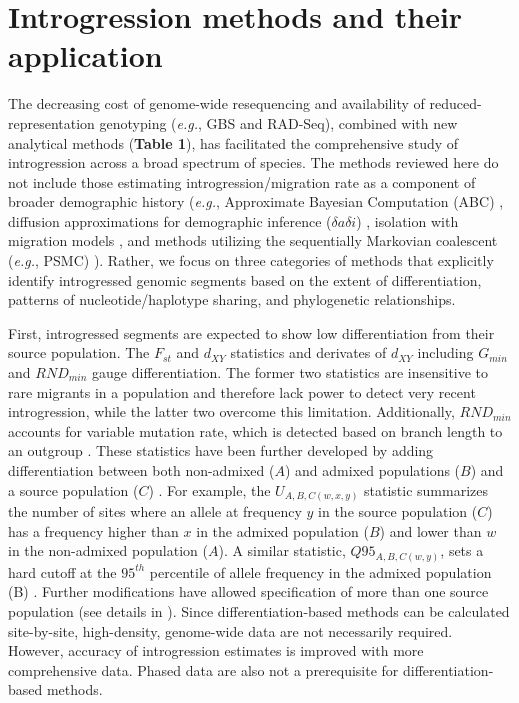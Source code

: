 \documentclass[11pt]{article}
\begin{document}
\section*{Introgression methods and their application}


The decreasing cost of genome-wide resequencing and availability of reduced-representation genotyping (\emph{e.g.}, GBS and RAD-Seq), combined with new analytical methods (\textbf{Table 1}), has facilitated the comprehensive study of introgression across a broad spectrum of species.
The methods reviewed here do not include those estimating introgression\slash migration rate as a component of broader demographic history (\emph{e.g.}, Approximate Bayesian Computation (ABC) \cite{beaumont2002}, diffusion approximations for demographic inference ($\delta a\delta i$) \cite{gutenkunst2009}, isolation with migration models \cite{hey2004}, and methods utilizing the sequentially Markovian coalescent (\emph{e.g.}, PSMC) \cite{li2011}). 
Rather, we focus on three categories of methods that explicitly identify introgressed genomic segments based on the extent of differentiation, patterns of nucleotide/haplotype sharing, and phylogenetic relationships.

First, introgressed segments are expected to show low differentiation from their source population.
The $F_{st}$ and $d_{XY}$ statistics and derivates of $d_{XY}$ including $G_{min}$ \cite{geneva2015} and $RND_{min}$\cite{rosenzweig2016} gauge differentiation. 
The former two statistics are insensitive to rare migrants in a population and therefore lack power to detect very recent introgression, while the latter two overcome this limitation.
Additionally, $RND_{min}$ accounts for variable mutation rate, which is detected based on branch length to an outgroup \cite{rosenzweig2016}.
These statistics have been further developed by adding differentiation between both non-admixed ($A$) and admixed populations ($B$) and a source population ($C$) \cite{racimo2016}. 
For example, the $U_{A,B,C(w,x,y)}$ statistic summarizes the number of sites where an allele at frequency $y$ in the source population ($C$) has a frequency higher than $x$ in the admixed population ($B$) and lower than $w$ in the non-admixed population ($A$).
A similar statistic, $Q95_{A,B,C(w,y)}$, sets a hard cutoff at the $95^{th}$ percentile of allele frequency in the admixed population (B) \cite{racimo2016}.
Further modifications have allowed specification of more than one source population (see details in \cite{racimo2016}).
Since differentiation-based methods can be calculated site-by-site, high-density, genome-wide data are not necessarily required.
However, accuracy of introgression estimates is improved with more comprehensive data.
Phased data are also not a prerequisite for differentiation-based methods.
 
\end{document}
